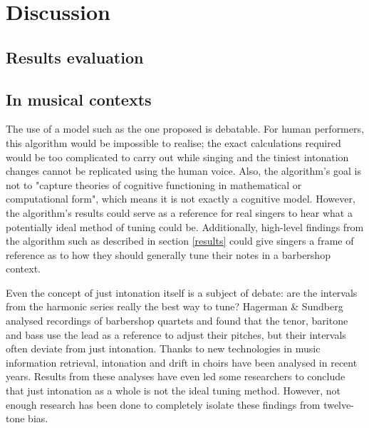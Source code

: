 \documentclass[a4paper]{article}
\begin{document}
% 

\section{Discussion}
\label{discussion}
\subsection{Results evaluation}

\subsection{In musical contexts}
The use of a model such as the one proposed is debatable. For human performers, this algorithm would be impossible to realise; the exact calculations required would be too complicated to carry out while singing and the tiniest intonation changes cannot be replicated using the human voice. Also, the algorithm's goal is not to "capture theories of cognitive functioning in mathematical or computational form", which means it is not exactly a cognitive model.\cite{van_maanen_interpretation_2021} However, the algorithm's results could serve as a reference for real singers to hear what a potentially ideal method of tuning could be. Additionally, high-level findings from the algorithm such as described in section \ref{results} could give singers a frame of reference as to how they should generally tune their notes in a barbershop context.

Even the concept of just intonation itself is a subject of debate: are the intervals from the harmonic series really the best way to tune? Hagerman \& Sundberg analysed recordings of barbershop quartets and found that the tenor, baritone and bass use the lead as a reference to adjust their pitches, but their intervals often deviate from just intonation.\cite{hagerman_fundamental_1980} Thanks to new technologies in music information retrieval, intonation and drift in choirs have been analysed in recent years.\cite{devaney_study_2012, mauch_intonation_2014, dai_intonation_2019} Results from these analyses have even led some researchers to conclude that just intonation as a whole is not the ideal tuning method.\cite{parncutt_psychocultural_2018} However, not enough research has been done to completely isolate these findings from twelve-tone bias.
\end{document}
